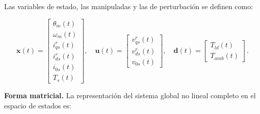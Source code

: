 \documentclass{article}
\begin{document}
Las variables de estado, las manipuladas y las de perturbación se definen como:

\[
\mathbf{x}(t) = 
\begin{bmatrix}
    \theta_m(t) \\
    \omega_m(t) \\
    i_{qs}^r(t) \\
    i_{ds}^r(t) \\
    i_{0s}(t) \\
    T_s(t)
\end{bmatrix}, \quad
\mathbf{u}(t) = 
\begin{bmatrix}
    v_{qs}^r(t) \\
    v_{ds}^r(t) \\
    v_{0s}(t)
\end{bmatrix}, \quad
\mathbf{d}(t) = 
\begin{bmatrix}
    T_{ld}(t) \\
    T_{amb}(t)
\end{bmatrix}.
\]

\noindent\textbf{Forma matricial.}
La representación del sistema global no lineal completo en el espacio de estados es:
\end{document}
